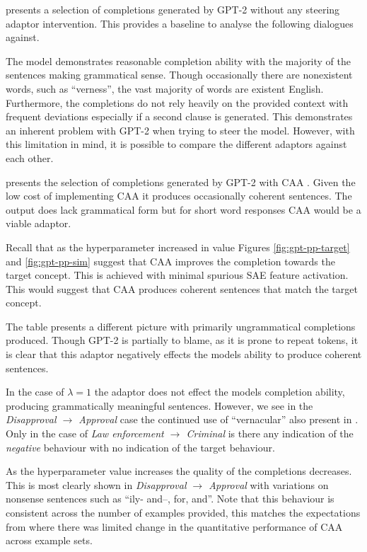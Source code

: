  presents a selection of completions generated by GPT-2 \citep{gpt-2} without any steering adaptor intervention.
This provides a baseline to analyse the following dialogues against.

The model demonstrates reasonable completion ability with the majority of the sentences making grammatical sense.
Though occasionally there are nonexistent words, such as ``verness'', the vast majority of words are existent English.
Furthermore, the completions do not rely heavily on the provided context with frequent deviations especially if a second clause is generated.
This demonstrates an inherent problem with GPT-2 when trying to steer the model.
However, with this limitation in mind, it is possible to compare the different adaptors against each other.




 presents the selection of completions generated by GPT-2 with CAA \citep{caa}.
Given the low cost of implementing CAA it produces occasionally coherent sentences.
The output does lack grammatical form but for short word responses CAA would be a viable adaptor.

Recall that as the hyperparameter increased in value Figures \ref{fig:gpt-pp-target} and \ref{fig:gpt-pp-sim} suggest that CAA improves the completion towards the target concept.
This is achieved with minimal spurious SAE feature activation.
This would suggest that CAA produces coherent sentences that match the target concept.

The table presents a different picture with primarily ungrammatical completions produced.
Though GPT-2 is partially to blame, as it is prone to repeat tokens, it is clear that this adaptor negatively effects the models ability to produce coherent sentences.

In the case of $\lambda = 1$ the adaptor does not effect the models completion ability, producing grammatically meaningful sentences.
However, we see in the \emph{Disapproval $\to$ Approval} case the continued use of ``vernacular'' also present in .
Only in the case of \emph{Law enforcement $\to$ Criminal} is there any indication of the \emph{negative} behaviour with no indication of the target behaviour.

As the hyperparameter value increases the quality of the completions decreases.
This is most clearly shown in \emph{Disapproval $\to$ Approval} with variations on nonsense sentences such as ``ily- and--, for, and''.
Note that this behaviour is consistent across the number of examples provided, this matches the expectations from  where there was limited change in the quantitative performance of CAA across example sets.

